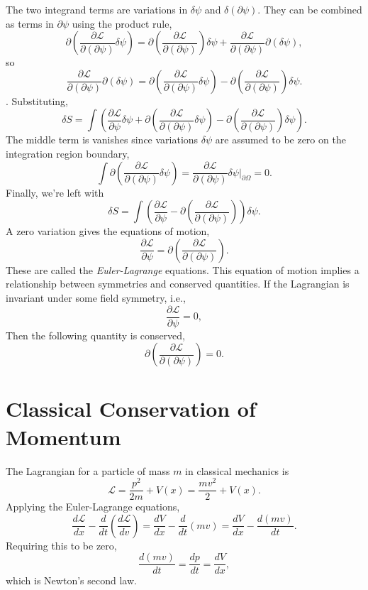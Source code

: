 The two integrand terms are variations in $\delta\psi$ and $\delta\left(\partial\psi\right)$. They can be combined as terms in $\partial\psi$ using the product rule,
\[
\partial\left(\frac{\partial \mathcal{L}}{\partial\left(\partial\psi\right)}\delta\psi\right) = \partial\left(\frac{\partial \mathcal{L}}{\partial\left(\partial\psi\right)}\right)\delta\psi +
\frac{\partial \mathcal{L}}{\partial\left(\partial\psi\right)}\partial\left(\delta\psi\right),
\]
so
\[
\frac{\partial \mathcal{L}}{\partial\left(\partial\psi\right)}\partial\left(\delta\psi\right) = \partial\left(\frac{\partial \mathcal{L}}{\partial\left(\partial\psi\right)}\delta\psi\right) -
\partial\left(\frac{\partial \mathcal{L}}{\partial\left(\partial\psi\right)}\right)\delta\psi. 
\].
Substituting,
\[
\delta S = \int \left(\frac{\partial\mathcal{L}}{\partial\psi}\delta\psi + \partial\left(\frac{\partial \mathcal{L}}{\partial\left(\partial\psi\right)}\delta\psi\right) -
\partial\left(\frac{\partial \mathcal{L}}{\partial\left(\partial\psi\right)}\right)\delta\psi\right). 
\]
The middle term is vanishes since variations $\delta\psi$ are assumed to be zero on the integration region boundary,
\[
\int \partial\left(\frac{\partial \mathcal{L}}{\partial\left(\partial\psi\right)}\delta\psi\right) = \frac{\partial \mathcal{L}}{\partial\left(\partial\psi\right)}\delta\psi \bigg\rvert_{\partial\Omega} = 0.
\]
Finally, we're left with
\[
\delta S = \int \left(\frac{\partial\mathcal{L}}{\partial\psi} -
\partial\left(\frac{\partial \mathcal{L}}{\partial\left(\partial\psi\right)}\right)\right)\delta\psi.
\]
A zero variation gives the equations of motion,
\[
\frac{\partial\mathcal{L}}{\partial\psi} =
\partial\left(\frac{\partial \mathcal{L}}{\partial\left(\partial\psi\right)}\right).
\]
These are called the \emph{Euler-Lagrange} equations. This equation of motion implies a relationship between symmetries and conserved quantities. If the Lagrangian is invariant under some field symmetry, i.e.,
\[
\frac{\partial\mathcal{L}}{\partial\psi} = 0,
\]
Then the following quantity is conserved,
\[
\partial\left(\frac{\partial \mathcal{L}}{\partial\left(\partial\psi\right)}\right) = 0.
\]

\section{Classical Conservation of Momentum}

The Lagrangian for a particle of mass $m$ in classical mechanics is
\[
\mathcal{L} = \frac{p^2}{2m} + V\left(x\right) = \frac{mv^2}{2}+ V\left(x\right).
\]
Applying the Euler-Lagrange equations,
\[
\frac{d\mathcal{L}}{d x} - \frac{d}{dt}\left(\frac{d\mathcal{L}}{d v}\right) = \frac{dV}{dx}- \frac{d}{dt}\left(mv\right) = \frac{dV}{dx} - \frac{d\left(mv\right)}{dt}.
\]
Requiring this to be zero,
\[
\frac{d\left(mv\right)}{dt} = \frac{dp}{dt} = \frac{dV}{dx},
\]
which is Newton's second law.

